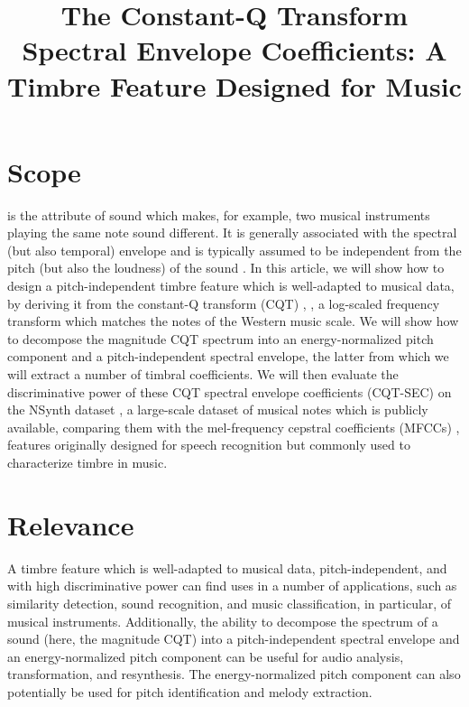 \documentclass[journal]{IEEEtran}
\begin{document}
\title{The Constant-Q Transform Spectral Envelope Coefficients: A Timbre Feature Designed for Music}

\maketitle

\section{Scope}

 is the attribute of sound which makes, for example, two musical instruments playing the same note sound different. It is generally associated with the spectral (but also temporal) envelope and is typically assumed to be independent from the pitch (but also the loudness) of the sound \cite{moore2004}. In this article, we will show how to design a pitch-independent timbre feature which is well-adapted to musical data, by deriving it from the constant-Q transform (CQT) \cite{brown1991}, \cite{brown1992}, a log-scaled frequency transform which matches the notes of the Western music scale. We will show how to decompose the magnitude CQT spectrum into an energy-normalized pitch component and a pitch-independent spectral envelope, the latter from which we will extract a number of timbral coefficients. We will then evaluate the discriminative power of these CQT spectral envelope coefficients (CQT-SEC) on the NSynth dataset \cite{engel2017}, a large-scale dataset of musical notes which is publicly available, comparing them with the mel-frequency cepstral coefficients (MFCCs) \cite{davis1980}, features originally designed for speech recognition but commonly used to characterize timbre in music. 


\section{Relevance}

A timbre feature which is well-adapted to musical data, pitch-independent, and with high discriminative power can find uses in a number of applications, such as similarity detection, sound recognition, and music classification, in particular, of musical instruments. Additionally, the ability to decompose the spectrum of a sound (here, the magnitude CQT) into a pitch-independent spectral envelope and an energy-normalized pitch component can be useful for audio analysis, transformation, and resynthesis. The energy-normalized pitch component can also potentially be used for pitch identification and melody extraction. 
\end{document}
